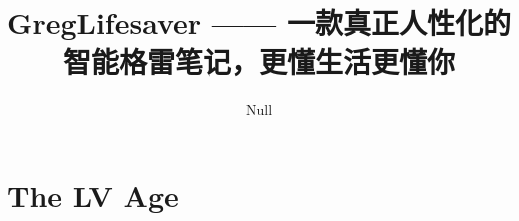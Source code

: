 \documentclass[cn,blue,14pt,normal]{elegantnote}
\title{GregLifesaver —— 一款真正人性化的智能格雷笔记，更懂生活更懂你}
\author{Null}
\institute{Nowhere}
\date{\zhtoday}
\begin{document}
\maketitle

\section{The LV Age}

\end{document}
